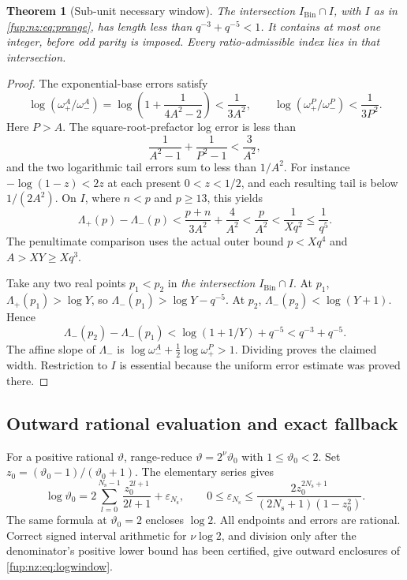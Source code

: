 \documentclass[11pt,letterpaper]{article}
\newtheorem{theorem}{Theorem}[section]
\theoremstyle{definition}\newtheorem{definition}[theorem]{Definition}
\theoremstyle{remark}\newtheorem{remark}[theorem]{Remark}
\begin{document}
\begin{theorem}[Sub-unit necessary window]\label{fup:nz:thm:window}
The intersection $I_{\mathrm{Bin}}\cap I$, with $I$ as in \eqref{fup:nz:eq:prange}, has length less than $q^{-3}+q^{-5}<1$. It contains at most one integer, before odd parity is imposed. Every ratio-admissible index lies in that intersection.
\end{theorem}
\begin{proof}
The exponential-base errors satisfy
\[
 \log(\omega^A_+/\omega^A_-)=\log\left(1+\frac1{4A^2-2}\right)<\frac1{3A^2},
 \qquad \log(\omega^P_+/\omega^P_-)<\frac1{3P^2}.
\]
Here $P>A$. The square-root-prefactor log error is less than
\[
 \frac1{A^2-1}+\frac1{P^2-1}<\frac3{A^2},
\]
and the two logarithmic tail errors sum to less than $1/A^2$. For instance $-\log(1-z)<2z$ at each present $0<z<1/2$, and each resulting tail is below $1/(2A^2)$. On $I$, where $n<p$ and $p\ge13$, this yields
\begin{equation}\label{fup:nz:eq:errorwidth}
 \Lambda_+(p)-\Lambda_-(p)<\frac{p+n}{3A^2}+\frac4{A^2}
 <\frac{p}{A^2}<\frac1{Xq^2}\le\frac1{q^5}.
\end{equation}
The penultimate comparison uses the actual outer bound $p<Xq^4$ and $A>XY\ge Xq^3$.

Take any two real points $p_1<p_2$ in \emph{the intersection} $I_{\mathrm{Bin}}\cap I$. At $p_1$, $\Lambda_+(p_1)>\log Y$, so $\Lambda_-(p_1)>\log Y-q^{-5}$. At $p_2$, $\Lambda_-(p_2)<\log(Y+1)$. Hence
\[
 \Lambda_-(p_2)-\Lambda_-(p_1)<\log(1+1/Y)+q^{-5}<q^{-3}+q^{-5}.
\]
The affine slope of $\Lambda_-$ is $\log \omega^A_-+\tfrac12\log \omega^P_+>1$. Dividing proves the claimed width. Restriction to $I$ is essential because the uniform error estimate was proved there.
\end{proof}

\subsection{Outward rational evaluation and exact fallback}
For a positive rational $\vartheta$, range-reduce $\vartheta=2^{\nu}\vartheta_0$ with $1\le \vartheta_0<2$. Set $z_0=(\vartheta_0-1)/(\vartheta_0+1)$. The elementary series gives
\begin{equation}\label{fup:nz:eq:atanh}
 \log \vartheta_0=2\sum_{l=0}^{N_{\mathrm s}-1}\frac{z_0^{2l+1}}{2l+1}+\varepsilon_{N_{\mathrm s}},
 \qquad
 0\le\varepsilon_{N_{\mathrm s}}\le
 \frac{2z_0^{2N_{\mathrm s}+1}}{(2N_{\mathrm s}+1)(1-z_0^2)}.
\end{equation}
The same formula at $\vartheta_0=2$ encloses $\log2$. All endpoints and errors are rational. Correct signed interval arithmetic for $\nu\log2$, and division only after the denominator's positive lower bound has been certified, give outward enclosures of \eqref{fup:nz:eq:logwindow}.
\end{document}

